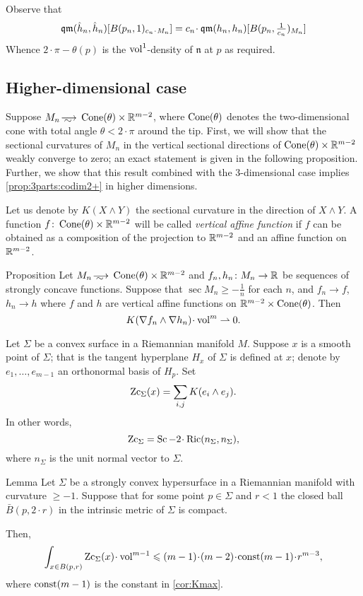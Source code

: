Observe that 
\[\qm(\hat h_n, \hat h_n)[B(p_n,1)_{c_n\cdot M_n}]
=
c_n\cdot \qm(h_n, h_n)[B(p_n,\tfrac1{c_n})_{M_n}]\]
Whence $2\cdot \pi-\theta(p)$ is the $\operatorname{vol}^1$-density of $\mathfrak n$ at $p$ as required.
\qeds

\subsection{Higher-dimensional case}


Suppose $M_n\smooths{} \Cone(\theta)\times \RR^{m-2}$, where $\operatorname{Cone}(\theta)$ denotes the two-dimensional cone with total angle $\theta<2\cdot\pi$ around the tip.
First, we will show that the sectional curvatures of $M_n$ in the vertical sectional directions of $\operatorname{Cone}(\theta)\times \mathbb{R}^{m-2}$ weakly converge to zero;
an exact statement is given in the following proposition.
Further, we show that this result combined with the 3-dimensional case implies \ref{prop:3parts:codim2+} in higher dimensions.

Let us denote by $K(X\wedge Y)$ the sectional curvature in the direction of $X\wedge Y$.
A function $f\colon\operatorname{Cone}(\theta)\times\mathbb{R}^{m-2}$ will be called \emph{vertical affine function} if $f$ can be obtained as a composition of the projection to $\mathbb{R}^{m-2}$ and an affine function on $\mathbb{R}^{m-2}$.

\begin{thm}{Proposition}\label{prop:vert-vert}
Let $M_n\smooths{} \Cone(\theta)\times\RR^{m-2}$
and $f_n,h_n\colon M_n\to \mathbb{R}$ be sequences of strongly concave functions.
Suppose that $\sec M_n\ge -\tfrac1n$ for each $n$,
and $f_n\to f$, 
$h_n\to h$ where $f$ and $h$ are vertical affine functions on $\mathbb{R}^{m-2}\times \operatorname{Cone}(\theta)$.
Then 
\[K(\nabla f_n\wedge\nabla h_n)\cdot\vol^m \rightharpoonup0.\]

\end{thm}

Let $\Sigma$ be a convex surface in a Riemannian manifold $M$.
Suppose $x$ is a smooth point of $\Sigma$; that is the tangent hyperplane $H_x$ of $\Sigma$ is defined at $x$;
denote by $e_1,\dots,e_{m-1}$ an orthonormal basis of $H_p$.
Set 
\[\operatorname{\rm Zc}_\Sigma(x)= \sum_{i,j} K(e_i\wedge e_j).\]
In other words, 
\[\Zc_\Sigma=\Sc-2\cdot\Ric(n_\Sigma,n_\Sigma),\]
where $n_\Sigma$ is the unit normal vector to $\Sigma$.

\begin{thm}{Lemma}\label{lem:nonsmooth-convex}
Let $\Sigma$ be a strongly convex hypersurface in a Riemannian manifold with curvature $\ge -1$.
Suppose that for some point $p\in \Sigma$ and $r<1$ the closed ball $\bar B(p,2\cdot r)$ in the intrinsic metric of $\Sigma$ is compact.

Then, 
\[\int_{x\in B(p,r)}\Zc_\Sigma(x)\cdot \vol^{m-1}\le (m-1)\cdot(m-2)\cdot\const(m-1)\cdot r^{m-3},\]
where $\mathrm{const}(m-1)$ is the constant in \ref{cor:Kmax}.
\end{thm}

